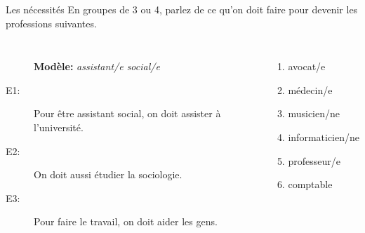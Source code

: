 \begin{frame}{Les nécessités}
  En groupes de 3 ou 4, parlez de ce qu'on doit faire pour devenir les professions suivantes.\\
  \begin{columns}
      \begin{description}
        \item[] \textbf{Modèle:} \emph{assistant/e social/e}
        \item[E1:] Pour être assistant social, on doit assister à l'université.
        \item[] 
        \item[E2:] On doit aussi étudier la sociologie.
        \item[] 
        \item[E3:] Pour faire le travail, on doit aider les gens.
        \item[] 
      \end{description}
      \begin{enumerate}
        \item avocat/e
        \item médecin/e
        \item musicien/ne
        \item informaticien/ne
        \item professeur/e
        \item comptable
      \end{enumerate}
  \end{columns}
\end{frame}